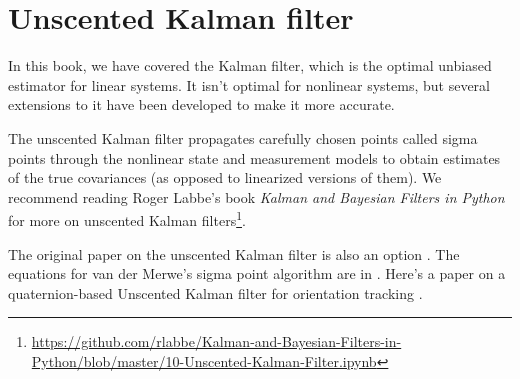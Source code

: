 \section{Unscented Kalman filter}
\label{sec:ukf}

In this book, we have covered the Kalman filter, which is the optimal unbiased
estimator for linear \glspl{system}. It isn't optimal for nonlinear
\glspl{system}, but several extensions to it have been developed to make it more
accurate.

The unscented Kalman filter propagates carefully chosen points called sigma
points through the nonlinear state and measurement models to obtain estimates of
the true covariances (as opposed to linearized versions of them). We recommend
reading Roger Labbe's book \textit{Kalman and Bayesian Filters in Python} for
more on unscented Kalman
filters\footnote{\url{https://github.com/rlabbe/Kalman-and-Bayesian-Filters-in-Python/blob/master/10-Unscented-Kalman-Filter.ipynb}}.

The original paper on the unscented Kalman filter is also an option
\cite{bib:unscented_kalman_filter}. The equations for van der Merwe's sigma
point algorithm are in \cite{bib:unscented_kalman_filter_2}. Here's a paper on a
quaternion-based Unscented Kalman filter for orientation tracking
\cite{bib:ukf_state_tracking}.
